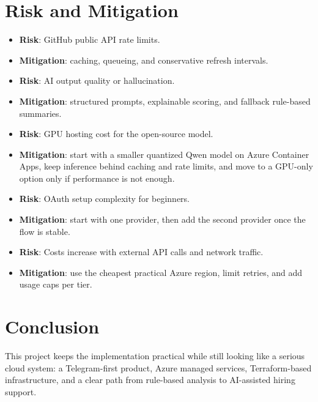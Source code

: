 \documentclass[11pt]{article}
\begin{document}
\section{Risk and Mitigation}
\begin{itemize}[leftmargin=*]
  \item \textbf{Risk}: GitHub public API rate limits.
  \item \textbf{Mitigation}: caching, queueing, and conservative refresh intervals.
  \item \textbf{Risk}: AI output quality or hallucination.
  \item \textbf{Mitigation}: structured prompts, explainable scoring, and fallback rule-based summaries.
  \item \textbf{Risk}: GPU hosting cost for the open-source model.
  \item \textbf{Mitigation}: start with a smaller quantized Qwen model on Azure Container Apps, keep inference behind caching and rate limits, and move to a GPU-only option only if performance is not enough.
  \item \textbf{Risk}: OAuth setup complexity for beginners.
  \item \textbf{Mitigation}: start with one provider, then add the second provider once the flow is stable.
  \item \textbf{Risk}: Costs increase with external API calls and network traffic.
  \item \textbf{Mitigation}: use the cheapest practical Azure region, limit retries, and add usage caps per tier.
\end{itemize}

\section{Conclusion}
This project keeps the implementation practical while still looking like a serious cloud system: a Telegram-first product, Azure managed services, Terraform-based infrastructure, and a clear path from rule-based analysis to AI-assisted hiring support.
\end{document}
